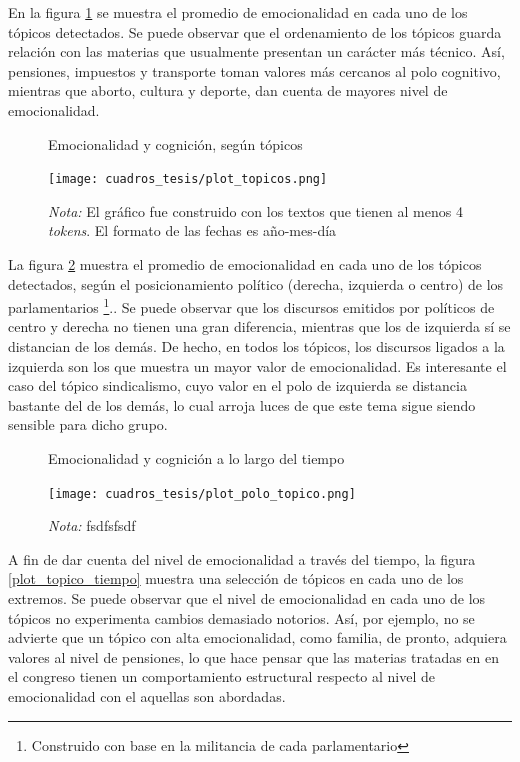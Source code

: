 \documentclass[
  12pt,
]{article}
\begin{document}
En la figura \ref{topicos} se muestra el promedio de emocionalidad en
cada uno de los tópicos detectados. Se puede observar que el
ordenamiento de los tópicos guarda relación con las materias que
usualmente presentan un carácter más técnico. Así, pensiones, impuestos
y transporte toman valores más cercanos al polo cognitivo, mientras que
aborto, cultura y deporte, dan cuenta de mayores nivel de emocionalidad.

\begin{figure}[H]
\centering
\large
\caption{Emocionalidad y cognición, según tópicos}
\label{topicos}
\texttt{[image: cuadros\_tesis/plot\_topicos.png]}
     \caption*{\footnotesize{\textit{Nota:} El gráfico fue construido con los textos que tienen al menos 4 \textit{tokens}. El formato de las fechas es año-mes-día }}
\normalsize
\end{figure}

La figura \ref{plot_polo_topico} muestra el promedio de emocionalidad en
cada uno de los tópicos detectados, según el posicionamiento político
(derecha, izquierda o centro) de los parlamentarios
\footnote{Construido con base en la militancia de cada parlamentario}..
Se puede observar que los discursos emitidos por políticos de centro y
derecha no tienen una gran diferencia, mientras que los de izquierda sí
se distancian de los demás. De hecho, en todos los tópicos, los
discursos ligados a la izquierda son los que muestra un mayor valor de
emocionalidad. Es interesante el caso del tópico sindicalismo, cuyo
valor en el polo de izquierda se distancia bastante del de los demás, lo
cual arroja luces de que este tema sigue siendo sensible para dicho
grupo.

\begin{figure}[H]
\centering
\large
\caption{Emocionalidad y cognición a lo largo del tiempo}
\label{plot_polo_topico}
\texttt{[image: cuadros\_tesis/plot\_polo\_topico.png]}
     \caption*{\footnotesize{\textit{Nota:} fsdfsfsdf }}
\normalsize
\end{figure}

A fin de dar cuenta del nivel de emocionalidad a través del tiempo, la
figura \ref{plot_topico_tiempo} muestra una selección de tópicos en cada
uno de los extremos. Se puede observar que el nivel de emocionalidad en
cada uno de los tópicos no experimenta cambios demasiado notorios. Así,
por ejemplo, no se advierte que un tópico con alta emocionalidad, como
familia, de pronto, adquiera valores al nivel de pensiones, lo que hace
pensar que las materias tratadas en en el congreso tienen un
comportamiento estructural respecto al nivel de emocionalidad con el
aquellas son abordadas.
\end{document}
